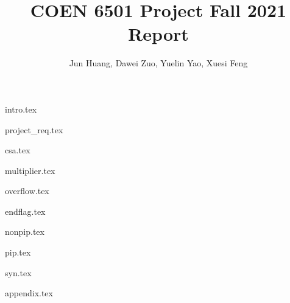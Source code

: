 \documentclass[stu, floatsintext, 10pt, donotrepeattitle, natbib]{apa7}
\title{COEN 6501 Project Fall 2021 Report}
\author{Jun Huang, Dawei Zuo, Yuelin Yao, Xuesi Feng}
\begin{document}
\maketitle

\renewcommand\contentsname{Table of Conetnts}
\tableofcontents
\setcounter{tocdepth}{5}

\newpage
\renewcommand{\listfigurename}{List of Figures}
\listoffigures
\newpage
\renewcommand{\listtablename}{List of Tables}
\listoftables


\newpage
{intro.tex}

\newpage
{project_req.tex}

\newpage
{csa.tex}

\newpage
{multiplier.tex}

\newpage
{overflow.tex}

\newpage
{endflag.tex}

\newpage
{nonpip.tex}

\newpage
{pip.tex}

\newpage
{syn.tex}

\newpage
{appendix.tex}

% 
\end{document}
